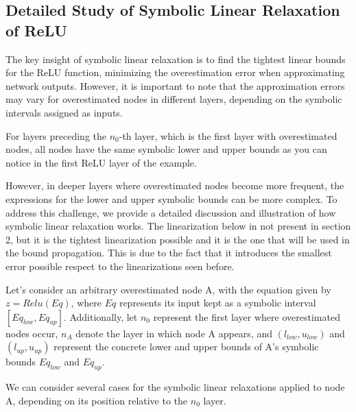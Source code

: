 \subsection{Detailed Study of Symbolic Linear Relaxation of ReLU}
The key insight of symbolic linear relaxation is to find the tightest linear bounds for the ReLU function, minimizing the overestimation error when approximating network outputs. However, it is important to note that the approximation errors may vary for overestimated nodes in different layers, depending on the symbolic intervals assigned as inputs.

For layers preceding the $n_0$-th layer, which is the first layer with overestimated nodes, all nodes have the same symbolic lower and upper bounds as you can notice in the first ReLU layer of the example.

However, in deeper layers where overestimated nodes become more frequent, the expressions for the lower and upper symbolic bounds can be more complex. To address this challenge, we provide a detailed discussion and illustration of how symbolic linear relaxation works.
The linearization below in not present in section 2, but it is the tightest linearization possible and it is the one that will be used in the bound propagation. This is due to the fact that it introduces the smallest error possible respect to the linearizations seen before.

Let's consider an arbitrary overestimated node A, with the equation given by $z = Relu(Eq)$, where $Eq$ represents its input kept as a symbolic interval $[Eq_{low}, Eq_{up}]$. Additionally, let $n_0$ represent the first layer where overestimated nodes occur, $n_A$ denote the layer in which node A appears, and $(l_{low}, u_{low})$ and $(l_{up}, u_{up})$ represent the concrete lower and upper bounds of A's symbolic bounds $Eq_{low}$ and $Eq_{up}$.

We can consider several cases for the symbolic linear relaxations applied to node A, depending on its position relative to the $n_0$ layer.
    
